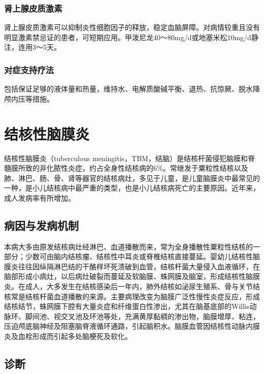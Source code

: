 \subsubsection{肾上腺皮质激素}

肾上腺皮质激素可以抑制炎性细胞因子的释放，稳定血脑屏障。对病情较重且没有明显激素禁忌证的患者，可短期应用。甲泼尼龙40～80mg/d或地塞米松10mg/d静注，连用3～5天。

\subsubsection{对症支持疗法}

包括保证足够的液体量和热量，维持水、电解质酸碱平衡、退热、抗惊厥、脱水降颅内压等措施。

\protect\hypertarget{text00248.html}{}{}

\section{结核性脑膜炎}

结核性脑膜炎（tuberculous
meningitis，TBM，结脑）是结核杆菌侵犯脑膜和脊髓膜所致的非化脓性炎症，约占全身性结核病的6\%。常继发于粟粒性结核以及肺、淋巴、肠、骨、肾等器官的结核病灶，多见于儿童，是儿童脑膜炎中最常见的一种，是小儿结核病中最严重的类型，也是小儿结核病死亡的主要原因。近年来，成人发病率有所增加。

\subsection{病因与发病机制}

本病大多由原发结核病灶经淋巴、血道播散而来，常为全身播散性粟粒性结核的一部分；少数可由脑内结核瘤、结核性中耳炎或脊椎结核直接蔓延。婴幼儿结核性脑膜炎往往因纵隔淋巴结的干酪样坏死溃破到血管，结核杆菌大量侵入血液循环，在脑部形成小病灶，以后病灶破裂而蔓延及软脑膜、蛛网膜及脑室，形成结核性脑膜炎。在成人，大多发生在结核感染后一年内，肺外结核如泌尿生殖系、骨与关节结核常是结核杆菌血道播散的来源。主要病理改变为脑膜广泛性慢性炎症反应，形成结核结节，蛛网膜下腔有大量炎症和纤维蛋白性渗出，尤其在脑基底部的Willis动脉环、脚间池、视交叉池及环池等处，充满黄厚黏稠的渗出物，脑膜增厚、粘连，压迫颅底脑神经及阻塞脑脊液循环通路，引起脑积水。脑膜血管因结核性动脉内膜炎及血栓形成而引起多处脑梗死及软化。

\subsection{诊断}

